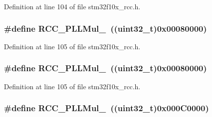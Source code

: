 Definition at line 104 of file stm32f10x\+\_\+rcc.\+h.

\subsubsection[{\texorpdfstring{R\+C\+C\+\_\+\+P\+L\+L\+Mul\+\_\+4}{RCC_PLLMul_4}}]{\setlength{\rightskip}{0pt plus 5cm}\#define R\+C\+C\+\_\+\+P\+L\+L\+Mul\+\_~(({\bf uint32\+\_\+t})0x00080000)}\hypertarget{group___p_l_l__multiplication__factor_ga897be2cbbdabb6035bfe9bd515d6897f}{}\label{group___p_l_l__multiplication__factor_ga897be2cbbdabb6035bfe9bd515d6897f}


Definition at line 105 of file stm32f10x\+\_\+rcc.\+h.

\subsubsection[{\texorpdfstring{R\+C\+C\+\_\+\+P\+L\+L\+Mul\+\_\+4}{RCC_PLLMul_4}}]{\setlength{\rightskip}{0pt plus 5cm}\#define R\+C\+C\+\_\+\+P\+L\+L\+Mul\+\_~(({\bf uint32\+\_\+t})0x00080000)}\hypertarget{group___p_l_l__multiplication__factor_ga897be2cbbdabb6035bfe9bd515d6897f}{}\label{group___p_l_l__multiplication__factor_ga897be2cbbdabb6035bfe9bd515d6897f}


Definition at line 105 of file stm32f10x\+\_\+rcc.\+h.

\subsubsection[{\texorpdfstring{R\+C\+C\+\_\+\+P\+L\+L\+Mul\+\_\+5}{RCC_PLLMul_5}}]{\setlength{\rightskip}{0pt plus 5cm}\#define R\+C\+C\+\_\+\+P\+L\+L\+Mul\+\_~(({\bf uint32\+\_\+t})0x000\+C0000)}\hypertarget{group___p_l_l__multiplication__factor_gad45e4f8edbbf4d49ded913e83e3a2d06}{}\label{group___p_l_l__multiplication__factor_gad45e4f8edbbf4d49ded913e83e3a2d06}


